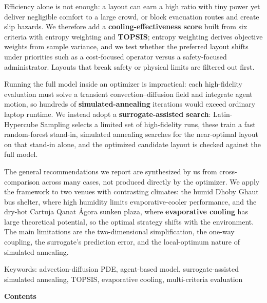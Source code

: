 \documentclass[11pt]{article}
\begin{document}
Efficiency alone is not enough: a layout can earn a high ratio with tiny power
yet deliver negligible comfort to a large crowd, or block evacuation routes and
create slip hazards. We therefore add a \textbf{cooling-effectiveness score} built
from six criteria with entropy weighting and \textbf{TOPSIS}; entropy weighting
derives objective weights from sample variance, and we test whether the preferred
layout shifts under priorities such as a cost-focused operator versus a
safety-focused administrator. Layouts that break safety or physical limits are
filtered out first.

Running the full model inside an optimizer is impractical: each high-fidelity
evaluation must solve a transient convection--diffusion field and integrate agent
motion, so hundreds of \textbf{simulated-annealing} iterations would exceed
ordinary laptop runtime. We instead adopt a \textbf{surrogate-assisted search}:
Latin-Hypercube Sampling selects a limited set of high-fidelity runs, these train
a fast random-forest stand-in, simulated annealing searches for the near-optimal
layout on that stand-in alone, and the optimized candidate layout is checked
against the full model.

The general recommendations we report are synthesized by us from cross-comparison
across many cases, not produced directly by the optimizer. We apply the framework
to two venues with contrasting climates: the humid Dhoby Ghaut bus shelter, where
high humidity limits evaporative-cooler performance, and the dry-hot Cartuja Qanat
\'Agora sunken plaza, where \textbf{evaporative cooling} has large theoretical
potential, so the optimal strategy shifts with the environment. The main
limitations are the two-dimensional simplification, the one-way coupling, the
surrogate's prediction error, and the local-optimum nature of simulated
annealing.

\vspace{12pt}
\noindent Keywords: advection-diffusion PDE, agent-based model, surrogate-assisted
simulated annealing, TOPSIS, evaporative cooling, multi-criteria evaluation

\clearpage

{\LARGE\bfseries Contents}\par
\vspace{14pt}
\begingroup
\large
\setlength{\parskip}{4pt}
\end{document}
